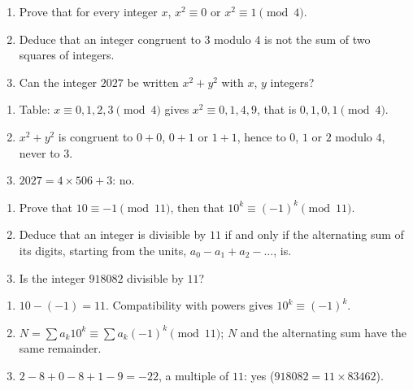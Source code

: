 \begin{exercise}
\begin{enumerate}
\item Prove that for every integer $x$, $x^2\equiv0$ or $x^2\equiv1\pmod4$.
\item Deduce that an integer congruent to $3$ modulo $4$ is not the sum of two squares of integers.
\item Can the integer $\num{2027}$ be written $x^2+y^2$ with $x$, $y$ integers?
\end{enumerate}
\end{exercise}
\begin{solution}
\begin{enumerate}
\item Table: $x\equiv0,1,2,3\pmod4$ gives $x^2\equiv0,1,4,9$, that is $0,1,0,1\pmod4$.
\item $x^2+y^2$ is congruent to $0+0$, $0+1$ or $1+1$, hence to $0$, $1$ or $2$ modulo $4$, never to $3$.
\item $\num{2027}=4\times506+3$: no.
\end{enumerate}
\end{solution}

\begin{exercise}
\begin{enumerate}
\item Prove that $10\equiv-1\pmod{11}$, then that $10^k\equiv(-1)^k\pmod{11}$.
\item Deduce that an integer is divisible by $11$ if and only if the alternating sum of its digits, starting from the units, $a_0-a_1+a_2-\dots$, is.
\item Is the integer $\num{918082}$ divisible by $11$?
\end{enumerate}
\end{exercise}
\begin{solution}
\begin{enumerate}
\item $10-(-1)=11$. Compatibility with powers gives $10^k\equiv(-1)^k$.
\item $N=\sum a_k10^k\equiv\sum a_k(-1)^k\pmod{11}$; $N$ and the alternating sum have the same remainder.
\item $2-8+0-8+1-9=-22$, a multiple of $11$: yes ($\num{918082}=11\times\num{83462}$).
\end{enumerate}
\end{solution}

